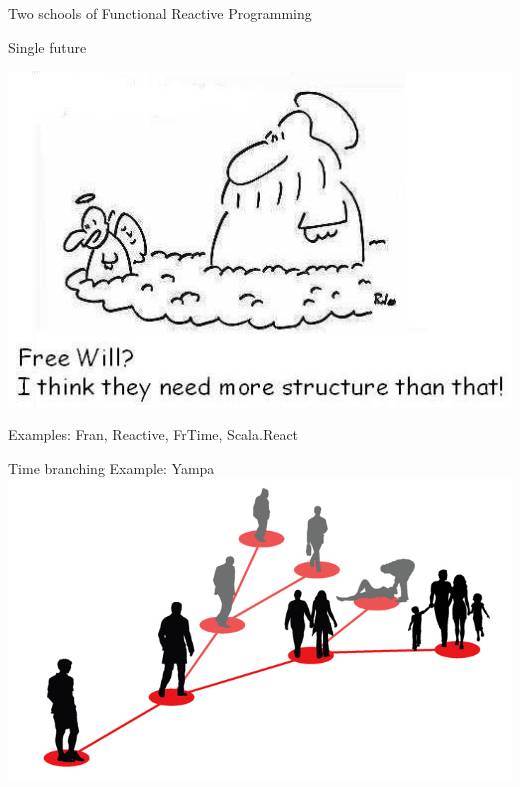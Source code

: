 \documentclass{beamer}
\begin{document}
\begin{frame}{Two schools of Functional Reactive Programming}

\begin{block}{Single future}

\vspace{-0.45cm}
\begin{center}
\includegraphics[scale=0.35]{free-will.jpg}
\end{center}
\vspace{-0.5cm}
Examples: Fran, Reactive, FrTime, Scala.React 

\end{block}
\begin{block}{Time branching}
Example: Yampa
\includegraphics[scale=0.17]{many-worlds.png}

\end{block}

\end{frame}
\end{document}

